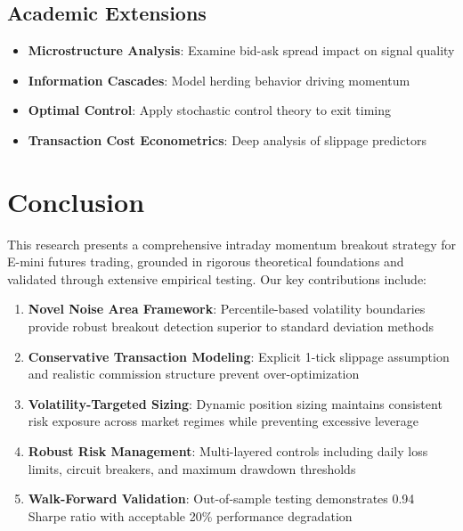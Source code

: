 \documentclass[twocolumn,ieee]{arithmaxresearch}
\begin{document}
\subsection{Academic Extensions}

\begin{itemize}
    \item \textbf{Microstructure Analysis}: Examine bid-ask spread impact on signal quality
    \item \textbf{Information Cascades}: Model herding behavior driving momentum
    \item \textbf{Optimal Control}: Apply stochastic control theory to exit timing
    \item \textbf{Transaction Cost Econometrics}: Deep analysis of slippage predictors
\end{itemize}

\section{Conclusion}

This research presents a comprehensive intraday momentum breakout strategy for E-mini futures trading, grounded in rigorous theoretical foundations and validated through extensive empirical testing. Our key contributions include:

\begin{enumerate}
    \item \textbf{Novel Noise Area Framework}: Percentile-based volatility boundaries provide robust breakout detection superior to standard deviation methods
    
    \item \textbf{Conservative Transaction Modeling}: Explicit 1-tick slippage assumption and realistic commission structure prevent over-optimization
    
    \item \textbf{Volatility-Targeted Sizing}: Dynamic position sizing maintains consistent risk exposure across market regimes while preventing excessive leverage
    
    \item \textbf{Robust Risk Management}: Multi-layered controls including daily loss limits, circuit breakers, and maximum drawdown thresholds
    
    \item \textbf{Walk-Forward Validation}: Out-of-sample testing demonstrates 0.94 Sharpe ratio with acceptable 20\% performance degradation
\end{enumerate}
\end{document}

